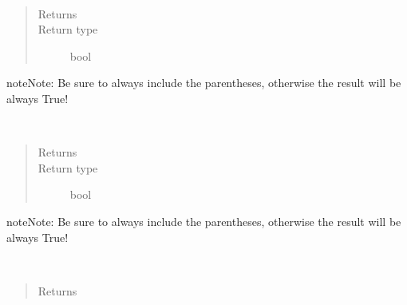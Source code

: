 \documentclass[letterpaper,10pt,english]{sphinxmanual}
\begin{document}
\begin{fulllineitems}
\begin{fulllineitems}
\end{fulllineitems}


\begin{fulllineitems}
\label{\detokenize{Reference:salabim.Component.ispassive}}~\begin{quote}\begin{description}
\item[{Returns}] \leavevmode
{}

\item[{Return type}] \leavevmode
bool

\end{description}\end{quote}

\begin{sphinxadmonition}{note}{Note:}
Be sure to always include the parentheses, otherwise the result will be always True!
\end{sphinxadmonition}

\end{fulllineitems}


\begin{fulllineitems}
\label{\detokenize{Reference:salabim.Component.isrequesting}}~\begin{quote}\begin{description}
\item[{Returns}] \leavevmode
{}

\item[{Return type}] \leavevmode
bool

\end{description}\end{quote}

\begin{sphinxadmonition}{note}{Note:}
Be sure to always include the parentheses, otherwise the result will be always True!
\end{sphinxadmonition}

\end{fulllineitems}


\begin{fulllineitems}
\label{\detokenize{Reference:salabim.Component.isscheduled}}~\begin{quote}\begin{description}
\item[{Returns}] \leavevmode
{}


\end{description}
\end{quote}
\end{fulllineitems}
\end{fulllineitems}
\end{document}
